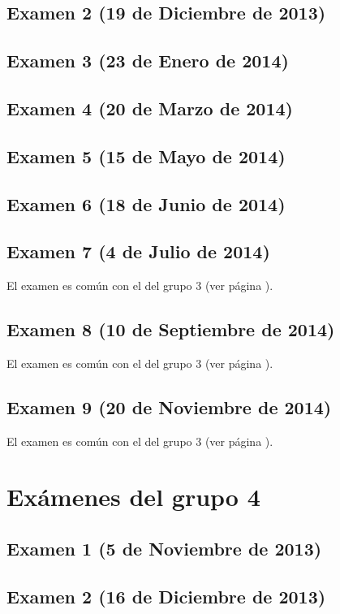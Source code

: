 \documentclass[a4paper,12pt,twoside]{book}
\begin{document}
\section{Examen 2 (19 de Diciembre de 2013)}
\section{Examen 3 (23 de Enero de 2014)}
 \label{examen_13_14_3_3}
\section{Examen 4 (20 de Marzo de 2014)}
\section{Examen 5 (15 de Mayo de 2014)}
\section{Examen 6 (18 de Junio de 2014)}
 \label{examen_13_14_3_6}
\section{Examen 7 (4 de Julio de 2014)}
El examen es común con el del grupo 3 (ver página \pageref{examen_13_14_1_7}). 
\section{Examen 8 (10 de Septiembre de 2014)}
El examen es común con el del grupo 3 (ver página \pageref{examen_13_14_1_8}). 
\section{Examen 9 (20 de Noviembre de 2014)}
El examen es común con el del grupo 3 (ver página \pageref{examen_13_14_1_9}). 

\chapter{Exámenes del grupo 4}
\section{Examen 1 (5 de Noviembre de 2013)}
\section{Examen 2 (16 de Diciembre de 2013)}
\end{document}
